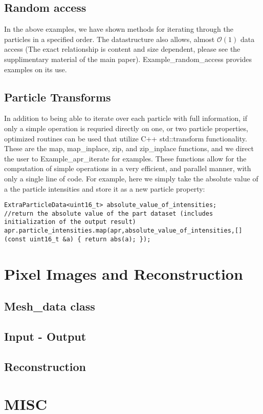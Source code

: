 \documentclass[12pt]{article}
\begin{document}
\subsection{Random access}
In the above examples, we have shown methods for iterating through the particles in a specified order. The datastructure also allows, almost $\mathcal{O}(1)$ data access (The exact relationship is content and size dependent, please see the supplimentary material of the main paper). Example\_random\_access provides examples on its use.
\subsection{Particle Transforms}
In addition to being able to iterate over each particle with full information, if only a simple operation is requried directly on one, or two particle properties, optimized routines can be used that utilize C++ std::transform functionality. These are the map, map\_inplace, zip, and zip\_inplace functions, and we direct the user to Example\_apr\_iterate for examples. These functions allow for the computation of simple operations in a very efficient, and parallel manner, with only a single line of code. For example, here we simply take the absolute value of a the particle intensities and store it as a new particle property:
\begin{lstlisting}
ExtraParticleData<uint16_t> absolute_value_of_intensities;
//return the absolute value of the part dataset (includes initialization of the output result)
apr.particle_intensities.map(apr,absolute_value_of_intensities,[](const uint16_t &a) { return abs(a); });
\end{lstlisting}
\section{Pixel Images and Reconstruction}
\subsection{Mesh\_data class}

\subsection{Input - Output}

\subsection{Reconstruction}

\section{MISC}
\end{document}
